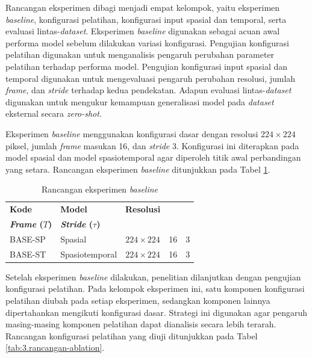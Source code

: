 Rancangan eksperimen dibagi menjadi empat kelompok, yaitu eksperimen \textit{baseline}, konfigurasi pelatihan, konfigurasi input spasial dan temporal, serta evaluasi lintas-\textit{dataset}. Eksperimen \textit{baseline} digunakan sebagai acuan awal performa model sebelum dilakukan variasi konfigurasi. Pengujian konfigurasi pelatihan digunakan untuk menganalisis pengaruh perubahan parameter pelatihan terhadap performa model. Pengujian konfigurasi input spasial dan temporal digunakan untuk mengevaluasi pengaruh perubahan resolusi, jumlah \textit{frame}, dan \textit{stride} terhadap kedua pendekatan. Adapun evaluasi lintas-\textit{dataset} digunakan untuk mengukur kemampuan generalisasi model pada \textit{dataset} eksternal secara \textit{zero-shot}. \par

Eksperimen \textit{baseline} menggunakan konfigurasi dasar dengan resolusi $224 \times 224$ piksel, jumlah \textit{frame} masukan 16, dan \textit{stride} 3. Konfigurasi ini diterapkan pada model spasial dan model spasiotemporal agar diperoleh titik awal perbandingan yang setara. Rancangan eksperimen \textit{baseline} ditunjukkan pada Tabel \ref{tab:3.rancangan-baseline}. \par

\begin{table}[H]
\centering
\caption{Rancangan eksperimen \textit{baseline}}
\label{tab:3.rancangan-baseline}
\begin{tabular}{llcrr}
\toprule
\textbf{Kode} & \textbf{Model} & \textbf{Resolusi} & \shortstack[c]{\textbf{Jumlah}\\ \textbf{\textit{Frame} ($T$)}} & \textbf{\textit{Stride} ($\tau$)} \\
\midrule
BASE-SP & Spasial & $224 \times 224$ & 16 & 3 \\
BASE-ST & Spasiotemporal & $224 \times 224$ & 16 & 3 \\
\bottomrule
\end{tabular}
\end{table}
\par

Setelah eksperimen \textit{baseline} dilakukan, penelitian dilanjutkan dengan pengujian konfigurasi pelatihan. Pada kelompok eksperimen ini, satu komponen konfigurasi pelatihan diubah pada setiap eksperimen, sedangkan komponen lainnya dipertahankan mengikuti konfigurasi dasar. Strategi ini digunakan agar pengaruh masing-masing komponen pelatihan dapat dianalisis secara lebih terarah. Rancangan konfigurasi pelatihan yang diuji ditunjukkan pada Tabel \ref{tab:3.rancangan-ablation}. \par

